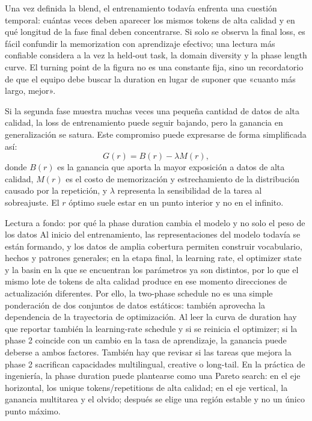 Una vez definida la blend, el entrenamiento todavía enfrenta una cuestión temporal: cuántas veces deben aparecer los mismos tokens de alta calidad y en qué longitud de la fase final deben concentrarse. Si solo se observa la final loss, es fácil confundir la memorization con aprendizaje efectivo; una lectura más confiable considera a la vez la held-out task, la domain diversity y la phase length curve. El turning point de la figura no es una constante fija, sino un recordatorio de que el equipo debe buscar la duration en lugar de suponer que «cuanto más largo, mejor».

Si la segunda fase muestra muchas veces una pequeña cantidad de datos de alta calidad, la loss de entrenamiento puede seguir bajando, pero la ganancia en generalización se satura. Este compromiso puede expresarse de forma simplificada así:
\[
G(r)=B(r)-\lambda M(r),
\]
donde $B(r)$ es la ganancia que aporta la mayor exposición a datos de alta calidad, $M(r)$ es el costo de memorización y estrechamiento de la distribución causado por la repetición, y $\lambda$ representa la sensibilidad de la tarea al sobreajuste. El $r$ óptimo suele estar en un punto interior y no en el infinito.







\begin{knowledgebox}{Lectura a fondo: por qué la phase duration cambia el modelo y no solo el peso de los datos}
Al inicio del entrenamiento, las representaciones del modelo todavía se están formando, y los datos de amplia cobertura permiten construir vocabulario, hechos y patrones generales; en la etapa final, la learning rate, el optimizer state y la basin en la que se encuentran los parámetros ya son distintos, por lo que el mismo lote de tokens de alta calidad produce en ese momento direcciones de actualización diferentes. Por ello, la two-phase schedule no es una simple ponderación de dos conjuntos de datos estáticos: también aprovecha la dependencia de la trayectoria de optimización. Al leer la curva de duration hay que reportar también la learning-rate schedule y si se reinicia el optimizer; si la phase 2 coincide con un cambio en la tasa de aprendizaje, la ganancia puede deberse a ambos factores. También hay que revisar si las tareas que mejora la phase 2 sacrifican capacidades multilingual, creative o long-tail. En la práctica de ingeniería, la phase duration puede plantearse como una Pareto search: en el eje horizontal, los unique tokens/repetitions de alta calidad; en el eje vertical, la ganancia multitarea y el olvido; después se elige una región estable y no un único punto máximo.
\end{knowledgebox}

